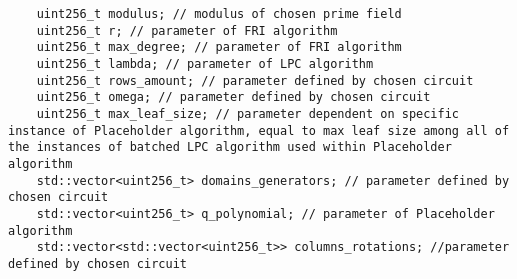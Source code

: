 \begin{verbatim}
    uint256_t modulus; // modulus of chosen prime field
    uint256_t r; // parameter of FRI algorithm
    uint256_t max_degree; // parameter of FRI algorithm
    uint256_t lambda; // parameter of LPC algorithm
    uint256_t rows_amount; // parameter defined by chosen circuit
    uint256_t omega; // parameter defined by chosen circuit
    uint256_t max_leaf_size; // parameter dependent on specific instance of Placeholder algorithm, equal to max leaf size among all of the instances of batched LPC algorithm used within Placeholder algorithm
    std::vector<uint256_t> domains_generators; // parameter defined by chosen circuit 
    std::vector<uint256_t> q_polynomial; // parameter of Placeholder algorithm
    std::vector<std::vector<uint256_t>> columns_rotations; //parameter defined by chosen circuit
\end{verbatim}
